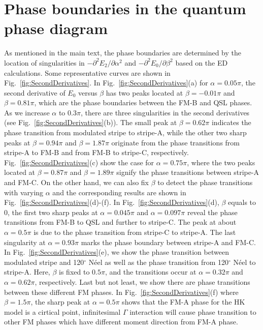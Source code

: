 \documentclass[aps,prb,reprint,amsfonts,amsmath,amssymb,showpacs,groupedaddress,superscriptaddress]{revtex4-1}
\begin{document}

\appendix

\section{\label{apx:PhaseBoundary}Phase boundaries in the quantum phase diagram}

As mentioned in the main text, the phase boundaries are determined by the location of singularities in $-\partial^{2} E_{2} / \partial \alpha^{2}$ and $-\partial^{2} E_{0} / \partial \beta^{2}$ based on the ED calculations. Some representative curves are shown in Fig.~\ref{fig:SecondDerivatives}. In Fig.~\ref{fig:SecondDerivatives}(a) for $\alpha=0.05\pi$, the second derivative of $E_0$ versus $\beta$ has two peaks located at $\beta=-0.01\pi$ and $\beta=0.81\pi$, which are the phase boundaries between the FM-B and QSL phases. As we increase $\alpha$ to $0.3\pi$, there are three singularities in the second derivatives (see Fig.~\ref{fig:SecondDerivatives}(b)). The small peak at $\beta=0.62\pi$ indicates the phase transition from modulated stripe to stripe-A, while the other two sharp peaks at $\beta=0.94\pi$ and $\beta=1.87\pi$ originate from the phase transitions from stripe-A to FM-B and from FM-B to stripe-C, respectively. Fig.~\ref{fig:SecondDerivatives}(c) show the case for $\alpha=0.75\pi$, where the two peaks located at $\beta=0.87\pi$ and $\beta=1.89\pi$ signify the phase transitions between stripe-A and FM-C. On the other hand, we can also fix $\beta$ to detect the phase transitions with varying $\alpha$ and the corresponding results are shown in Fig.~\ref{fig:SecondDerivatives}(d)-(f). In Fig.~\ref{fig:SecondDerivatives}(d), $\beta$ equals to $0$, the first two sharp peaks at $\alpha=0.045\pi$ and $\alpha=0.097\pi$ reveal the phase transitions from FM-B to QSL and further to stripe-C. The peak at about $\alpha=0.5\pi$ is due to the phase transition from stripe-C to stripe-A. The last singularity at $\alpha=0.93\pi$ marks the phase boundary between stripe-A and FM-C. In Fig.~\ref{fig:SecondDerivatives}(e), we show the phase transition between modulated stripe and 120$^\circ$ N\'{e}el as well as the phase transition from 120$^\circ$ N\'{e}el to stripe-A. Here, $\beta$ is fixed to $0.5\pi$, and the transitions occur at $\alpha=0.32\pi$ and $\alpha=0.62\pi$, respectively. Last but not least, we show there are phase transitions between these different FM phases. In Fig.~\ref{fig:SecondDerivatives}(f) where $\beta=1.5\pi$, the sharp peak at $\alpha=0.5\pi$ shows that the FM-A phase for the HK model is a cirtical point, infinitesimal $\Gamma$ interaction will cause phase transition to other FM phases which have different moment direction from FM-A phase.
\end{document}
